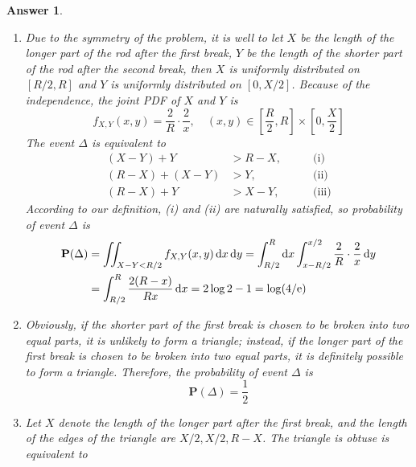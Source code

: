 \documentclass[utf8]{article}
\theoremstyle{definition}%
\theoremstyle{plain}%
\newtheorem{answer}{Answer} %
\begin{document}
\begin{answer} ~
    \begin{enumerate}[label=(\alph*)]
        \item Due to the symmetry of the problem, it is well to let $X$ be the length of the longer part of the rod after the first break, $Y$ be the length of the shorter part of the rod after the second break, then $X$ is uniformly distributed on $[R/2, R]$ and $Y$ is uniformly distributed on $[0, X/2]$. Because of the independence, the joint PDF of $X$ and $Y$ is
        \begin{equation}
            f_{X, Y}(x, y) = \frac{2}{R} \cdot \frac{2}{x}, \quad (x, y) \in \left[\frac{R}{2}, R\right] \times \left[0, \frac{X}{2}\right]
        \end{equation}
        The event $\Delta$ is equivalent to 
        \begin{equation}
        \begin{aligned}
            (X - Y) + Y &> R - X, \quad\quad &\text{(i)} \\ 
            (R - X) + (X - Y) &> Y, \quad\quad &\text{(ii)} \\
            (R - X) + Y &> X - Y, \quad\quad &\text{(iii)}
        \end{aligned}
        \end{equation}
        According to our definition, (i) and (ii) are naturally satisfied, so probability of event $\Delta$ is
        \begin{equation}
        \begin{aligned}
            \mathbf{P}(\Delta) &= \iint_{X-Y<R/2} f_{X, Y}(x, y) \dd{x}\dd{y} = \int_{R/2}^{R} \dd{x} \int_{x-R/2}^{x/2} \frac{2}{R} \cdot \frac{2}{x} \dd{y} \\
            &= \int_{R/2}^{R} \frac{2(R - x)}{Rx} \dd{x} = 2\log 2 - 1 = \log(4/\mathrm{e})
        \end{aligned}
        \end{equation}
        \item Obviously, if the shorter part of the first break is chosen to be broken into two equal parts, it is unlikely to form a triangle; instead, if the longer part of the first break is chosen to be broken into two equal parts, it is definitely possible to form a triangle. Therefore, the probability of event $\Delta$ is
        \begin{equation}
            \mathbf{P}(\Delta) = \frac{1}{2}
        \end{equation}
        \item Let $X$ denote the length of the longer part after the first break, and the length of the edges of the triangle are $X/2, X/2, R-X$. The triangle is obtuse is equivalent to

\end{enumerate}
\end{answer}
\end{document}
